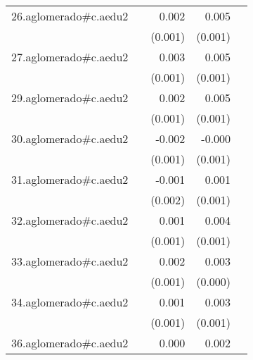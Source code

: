 {\begin{longtable}{l*{4}{D{.}{.}{-1}}}
\addlinespace
26.aglomerado#c.aedu2&                     &       0.002         &       0.005\sym{***}&                     \\
            &                     &     (0.001)         &     (0.001)         &                     \\
\addlinespace
27.aglomerado#c.aedu2&                     &       0.003         &       0.005\sym{***}&                     \\
            &                     &     (0.001)         &     (0.001)         &                     \\
\addlinespace
29.aglomerado#c.aedu2&                     &       0.002         &       0.005\sym{***}&                     \\
            &                     &     (0.001)         &     (0.001)         &                     \\
\addlinespace
30.aglomerado#c.aedu2&                     &      -0.002         &      -0.000         &                     \\
            &                     &     (0.001)         &     (0.001)         &                     \\
\addlinespace
31.aglomerado#c.aedu2&                     &      -0.001         &       0.001         &                     \\
            &                     &     (0.002)         &     (0.001)         &                     \\
\addlinespace
32.aglomerado#c.aedu2&                     &       0.001         &       0.004\sym{***}&                     \\
            &                     &     (0.001)         &     (0.001)         &                     \\
\addlinespace
33.aglomerado#c.aedu2&                     &       0.002         &       0.003\sym{***}&                     \\
            &                     &     (0.001)         &     (0.000)         &                     \\
\addlinespace
34.aglomerado#c.aedu2&                     &       0.001         &       0.003\sym{***}&                     \\
            &                     &     (0.001)         &     (0.001)         &                     \\
\addlinespace
36.aglomerado#c.aedu2&                     &       0.000         &       0.002\sym{**} &                     \\

\end{longtable}}

